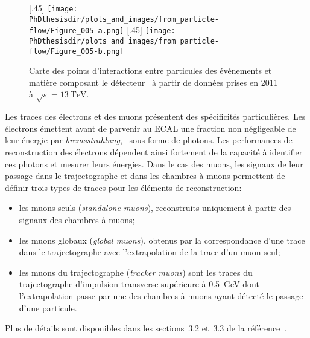\begin{figure}[h]
\centering
{}[.45\textwidth]
{\texttt{[image: \\PhDthesisdir/plots\_and\_images/from\_particle-flow/Figure\_005-a.png]}}
\hfill
{}[.45\textwidth]
{\texttt{[image: \\PhDthesisdir/plots\_and\_images/from\_particle-flow/Figure\_005-b.png]}}
\caption[Points d'interactions entre particules des événements et matière composant le détecteur.]{Carte des points d'interactions entre particules des événements et matière composant le détecteur~\cite{particle-flow} à partir de données prises en 2011 à $\sqrt{s}=\SI{13}{\TeV}$.}
\label{fig-chapter-LHC-section-evt_reco-subsec-PF_elements-CMS-self-radio}
\end{figure}
\par Les traces des électrons et des muons présentent des spécificités particulières.
Les électrons émettent avant de parvenir au ECAL une fraction non négligeable de leur énergie par \emph{bremsstrahlung}, \ie\ sous forme de photons.
Les performances de reconstruction des électrons dépendent ainsi fortement de la capacité à identifier ces photons et mesurer leurs énergies.
Dans le cas des muons, les signaux de leur passage dans le trajectographe et dans les chambres à muons permettent de définir trois types de traces pour les éléments de reconstruction:
\begin{itemize}
\item les muons seuls (\emph{standalone muons}), reconstruits uniquement à partir des signaux des chambres à muons;
\item les muons globaux (\emph{global muons}), obtenus par la correspondance d'une trace dans le trajectographe avec l'extrapolation de la trace d'un muon seul;
\item les muons du trajectographe (\emph{tracker muons}) sont les traces du trajectographe d'impulsion transverse supérieure à \SI{0.5}{\GeV} dont l'extrapolation passe par une des chambres à muons ayant détecté le passage d'une particule.
\end{itemize}
Plus de détails sont disponibles dans les sections~3.2 et~3.3 de la référence~\cite{particle-flow}.
